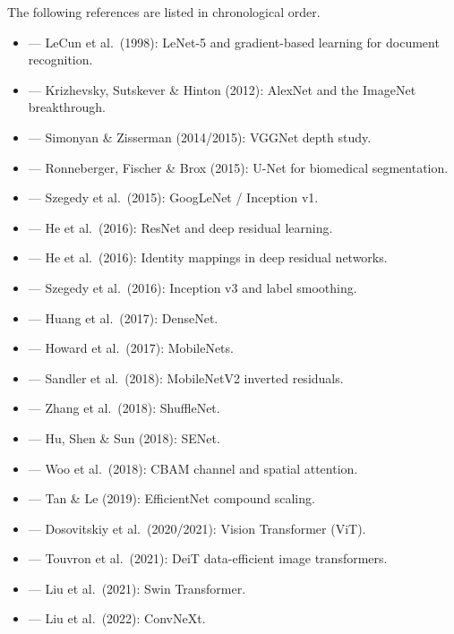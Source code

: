 The following references are listed in chronological order.

\begin{itemize}
    \item \cite{lecun1998gradient} --- LeCun et al.\ (1998): LeNet-5 and gradient-based learning for document recognition.
    \item \cite{krizhevsky2012imagenet} --- Krizhevsky, Sutskever \& Hinton (2012): AlexNet and the ImageNet breakthrough.
    \item \cite{simonyan2014very} --- Simonyan \& Zisserman (2014/2015): VGGNet depth study.
    \item \cite{ronneberger2015u} --- Ronneberger, Fischer \& Brox (2015): U-Net for biomedical segmentation.
    \item \cite{szegedy2015going} --- Szegedy et al.\ (2015): GoogLeNet / Inception v1.
    \item \cite{he2016deep} --- He et al.\ (2016): ResNet and deep residual learning.
    \item \cite{he2016identity} --- He et al.\ (2016): Identity mappings in deep residual networks.
    \item \cite{szegedy2016rethinking} --- Szegedy et al.\ (2016): Inception v3 and label smoothing.
    \item \cite{huang2017densely} --- Huang et al.\ (2017): DenseNet.
    \item \cite{howard2017mobilenets} --- Howard et al.\ (2017): MobileNets.
    \item \cite{sandler2018mobilenetv2} --- Sandler et al.\ (2018): MobileNetV2 inverted residuals.
    \item \cite{zhang2018shufflenet} --- Zhang et al.\ (2018): ShuffleNet.
    \item \cite{hu2018squeeze} --- Hu, Shen \& Sun (2018): SENet.
    \item \cite{woo2018cbam} --- Woo et al.\ (2018): CBAM channel and spatial attention.
    \item \cite{tan2019efficientnet} --- Tan \& Le (2019): EfficientNet compound scaling.
    \item \cite{dosovitskiy2020image} --- Dosovitskiy et al.\ (2020/2021): Vision Transformer (ViT).
    \item \cite{touvron2021training} --- Touvron et al.\ (2021): DeiT data-efficient image transformers.
    \item \cite{liu2021swin} --- Liu et al.\ (2021): Swin Transformer.
    \item \cite{liu2022convnet} --- Liu et al.\ (2022): ConvNeXt.
\end{itemize}

